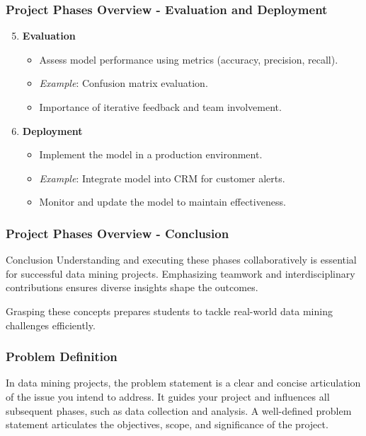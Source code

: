 \documentclass[aspectratio=169]{beamer}
\begin{document}
\begin{frame}[fragile]
    \frametitle{Project Phases Overview - Evaluation and Deployment}
    \begin{enumerate}
        \setcounter{enumi}{4}
        \item \textbf{Evaluation}
        \begin{itemize}
            \item Assess model performance using metrics (accuracy, precision, recall).
            \item \textit{Example}: Confusion matrix evaluation.
            \item Importance of iterative feedback and team involvement.
        \end{itemize}

        \item \textbf{Deployment}
        \begin{itemize}
            \item Implement the model in a production environment.
            \item \textit{Example}: Integrate model into CRM for customer alerts.
            \item Monitor and update the model to maintain effectiveness.
        \end{itemize}
    \end{enumerate}
\end{frame}

\begin{frame}[fragile]
    \frametitle{Project Phases Overview - Conclusion}
    \begin{block}{Conclusion}
        Understanding and executing these phases collaboratively is essential for successful data mining projects. Emphasizing teamwork and interdisciplinary contributions ensures diverse insights shape the outcomes.
        
        Grasping these concepts prepares students to tackle real-world data mining challenges efficiently.
    \end{block}
\end{frame}

\begin{frame}[fragile]
    \frametitle{Problem Definition}
    In data mining projects, the problem statement is a clear and concise articulation of the issue you intend to address.  
    It guides your project and influences all subsequent phases, such as data collection and analysis.  
    A well-defined problem statement articulates the objectives, scope, and significance of the project.
\end{frame}
\end{document}
